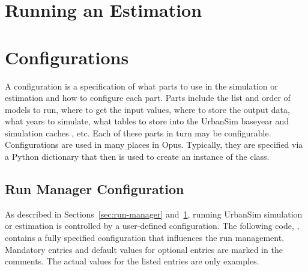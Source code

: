 \section{Running an Estimation}
\label{sec:running-estimation}


\section{Configurations}
\label{sec:configuration}
%
A configuration is a specification of what parts to use in the simulation or estimation
and how to configure each part.  Parts include the list and order of models \modelsindex to
run, where to get the input values, where to store the output data, what years
to simulate, what tables to store into the UrbanSim baseyear and simulation
caches \baseyearcacheindex\simulationcacheindex, etc. Each of these parts in
turn may be configurable. Configurations are used in many places in Opus.  Typically, they are specified
via a Python \pythonindex dictionary that then is used to create an instance of the
 class.

\subsection{Run Manager Configuration}
\label{sec:run-manager-configuration}
%

As described in Sections~\ref{sec:run-manager} and~\ref{sec:running-estimation}, 
running UrbanSim simulation or estimation is controlled by a user-defined
configuration. The following code, , contains a fully specified configuration
that influences the run management. \runmanagerindex Mandatory entries and default
values for optional entries are marked in the comments. The actual values for
the listed entries are only examples.

